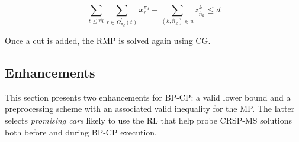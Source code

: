 \documentclass[12pt]{article}
\begin{document}



\begin{equation}\label{cut2}
    \sum_{t\leqslant \widehat{m}}{\sum_{r\in \Omega^{\prime}_{\pi_d}(t)}{x^{\pi_d}_r}}+\sum_{(k,\widehat{n}_k)\in u}{z^{k}_{\widehat{n}_k}}\leqslant d
\end{equation}

Once a cut is added, the RMP is solved again using CG.


\subsection{Enhancements}\label{sec4-5}
This section presents two enhancements for BP-CP: a valid lower bound and a preprocessing scheme with an associated valid inequality for the MP. The latter selects \textit{promising cars} likely to use the RL that help probe CRSP-MS solutions both before and during BP-CP execution.
\end{document}
